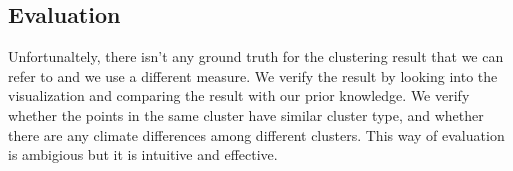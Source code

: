 \subsection{Evaluation}
Unfortunaltely, there isn't any ground truth for the clustering result that we can refer to and we use a different measure. We verify the result by looking into the visualization and comparing the result with our prior knowledge. We verify whether the points in the same cluster have similar cluster type, and whether there are any climate differences among different clusters. This way of evaluation is ambigious but it is intuitive and effective.
